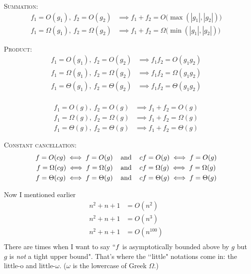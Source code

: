 \begin{prop}
  \mbox{}
  \begin{myenum}
  \item
    \textsc{Summation:}
    \begin{align*}
    f_1 = O(g_1), \ f_2 = O(g_2) &\implies f_1 + f_2 = O \bigl( \max(|g_1|,|g_2|) \bigr) \\
    f_1 = \Omega(g_1), \ f_2 = \Omega(g_2) &\implies f_1 + f_2 = \Omega \bigl( \min(|g_1|,|g_2|) \bigr)
    \end{align*}
  \item
    \textsc{Product:}
    \begin{align*}
    f_1 = O(g_1), \ f_2 = O(g_2) &\implies f_1 f_2 = O(g_1 g_2) \\
    f_1 = \Omega(g_1), \ f_2 = \Omega(g_2) &\implies f_1 f_2 = \Omega(g_1 g_2) \\
    f_1 = \Theta(g_1), \ f_2 = \Theta(g_2) &\implies f_1 f_2 = \Theta(g_1 g_2) \\
    \end{align*}
  \end{myenum}
\end{prop}


\begin{cor}
    \begin{align*}
    f_1 = O(g), \ f_2 = O(g) &\implies f_1 + f_2 = O(g) \\
    f_1 = \Omega(g), \ f_2 = \Omega(g) &\implies f_1 + f_2 = \Omega(g) \\
    f_1 = \Theta(g), \ f_2 = \Theta(g) &\implies f_1 + f_2 = \Theta(g) 
    \end{align*}
\end{cor}

\begin{cor}
    \textsc{Constant cancellation:}
    \begin{align*}
      f = O(cg) \iff f = O(g)           &\text{ \,\,\, and \,\,\, } cf = O(g) \iff f = O(g) \\
      f = \Omega(cg) \iff f = \Omega(g) &\text{ \,\,\, and \,\,\, } cf = \Omega(g) \iff f = \Omega(g) \\
      f = \Theta(cg) \iff f = \Theta(g) &\text{ \,\,\, and \,\,\, } cf = \Theta(g) \iff f = \Theta(g)
    \end{align*}
\end{cor}

Now I mentioned earlier
\begin{align*}
n^2 + n + 1 &= O(n^2) \\
n^2 + n + 1 &= O(n^3) \\
n^2 + n + 1 &= O(n^{100}) \\
\end{align*}
There are times when I want to say $\lq\lq f$ is asymptotically bounded
above by $g$ but $g$ is \textit{not} a tight upper bound".
That's where  
the \lq\lq little" notations come in: 
the little-o and little-$\omega$.
($\omega$ is the lowercase of Greek $\Omega$.)

